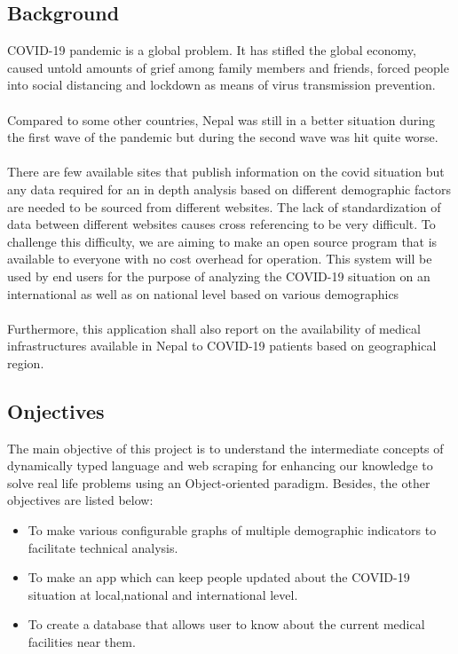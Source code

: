 \documentclass{article}
\begin{document}
\subsection{Background}
COVID-19 pandemic is a global problem. It has stifled the global economy, caused untold amounts of grief among family members and friends, forced people into social 
distancing and lockdown as means of virus transmission prevention.
\\\\
Compared to some other countries, Nepal was still in a better situation during the first wave of the pandemic but during the second wave was hit quite worse.
\\\\
There are few available sites that publish information on the covid situation but any data required for an in depth analysis based on different demographic factors 
are needed to be sourced from different websites. The lack of standardization of data between different websites causes cross referencing to be very difficult. To 
challenge this difficulty, we are aiming to make an open source program that is available to everyone with no cost overhead for operation. This system will be used 
by end users for the purpose of analyzing the COVID-19 situation on an international as well as on national level based on various demographics
\\\\
Furthermore, this application shall also report on the availability of medical infrastructures available in Nepal to COVID-19 patients based on geographical region.

\vspace*{5mm}
\subsection{Onjectives}
The main objective of this project is to understand the intermediate concepts of dynamically typed language and web scraping for enhancing our knowledge to solve 
real life problems using an Object-oriented paradigm. Besides, the other objectives are listed below:
\begin{itemize}
    \item To make various configurable graphs of multiple demographic indicators to facilitate technical analysis.
    \item To make an app which can keep people updated about the COVID-19 situation at local,national and international level. 
    \item To create a database that allows user to know about the current medical facilities near them.     
\end{itemize}
\end{document}
